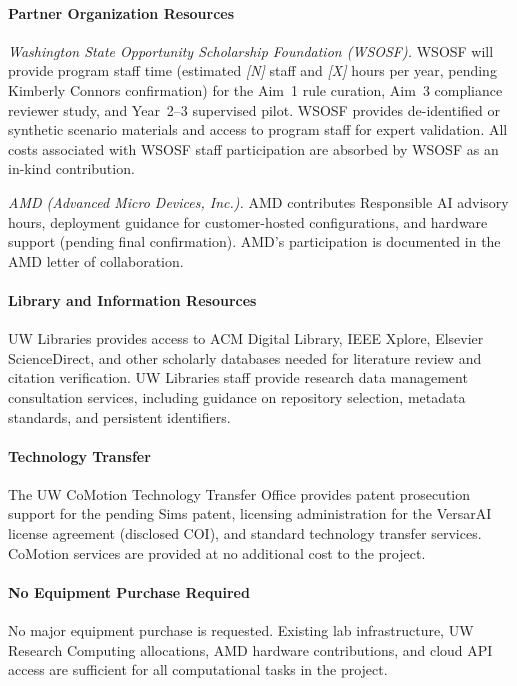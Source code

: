 \paragraph{Partner Organization Resources}

\textit{Washington State Opportunity Scholarship Foundation (WSOSF).} WSOSF will provide program staff time (estimated \textit{[N]} staff and \textit{[X]} hours per year, pending Kimberly Connors confirmation) for the Aim~1 rule curation, Aim~3 compliance reviewer study, and Year~2--3 supervised pilot. WSOSF provides de-identified or synthetic scenario materials and access to program staff for expert validation. All costs associated with WSOSF staff participation are absorbed by WSOSF as an in-kind contribution.

\textit{AMD (Advanced Micro Devices, Inc.).} AMD contributes Responsible AI advisory hours, deployment guidance for customer-hosted configurations, and hardware support (pending final confirmation). AMD's participation is documented in the AMD letter of collaboration.

\paragraph{Library and Information Resources}

UW Libraries provides access to ACM Digital Library, IEEE Xplore, Elsevier ScienceDirect, and other scholarly databases needed for literature review and citation verification. UW Libraries staff provide research data management consultation services, including guidance on repository selection, metadata standards, and persistent identifiers.

\paragraph{Technology Transfer}

The UW CoMotion Technology Transfer Office provides patent prosecution support for the pending Sims patent, licensing administration for the VersarAI license agreement (disclosed COI), and standard technology transfer services. CoMotion services are provided at no additional cost to the project.

\paragraph{No Equipment Purchase Required}

No major equipment purchase is requested. Existing lab infrastructure, UW Research Computing allocations, AMD hardware contributions, and cloud API access are sufficient for all computational tasks in the project.

